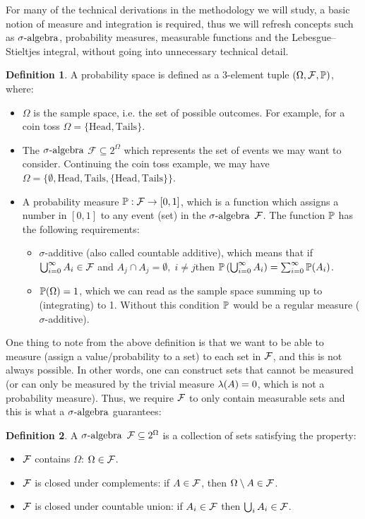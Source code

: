 \documentclass[a4paper,12pt,twoside,openright]{report}
\theoremstyle{definition}
\newtheorem{definition}{Definition}[section]
\begin{document}
For many of the technical derivations in the methodology we will study, a basic notion of measure and integration is required, thus we will refresh concepts such as $\sigalg$, probability measures,  measurable functions and the Lebesgue–Stieltjes integral, without going into unnecessary technical detail.

\begin{definition} \label{def:prob_space}
A probability space is defined as a 3-element tuple $\probspace$, where:
\begin{itemize}
    \item $\Omega$ is the sample space, i.e. the set of possible outcomes. For example, for a coin toss $\Omega=\{\text{Head}, \text{Tails}\}$. 
    \item The $\sigalg$ $\mathcal{F} \subseteq 2^{\Omega}$ which represents the set of events we may want to consider. Continuing the coin toss example, we may have $\Omega=\{\emptyset, \text{Head}, \text{Tails},\{\text{Head}, \text{Tails}\}\}$.
    \item A probability measure $\P:\calF \rightarrow [0,1]$, which is a function which assigns a number in $[0,1]$ to any event (set) in the $\sigalg$ $\calF$. The function $\P$ has the following requirements:
    \begin{itemize}
        \item $\sigma$-additive (also called countable additive), which means that if  $\bigcup_{i=0}^\infty  A_i\in \calF$ and $A_j \cap A_j = \emptyset, \; i \neq j$then $\P\left(\bigcup_{i=0}^\infty A_i\right) =\sum_{i=0}^\infty \P(A_i) $.
        \item $\P(\Omega)=1$, which we can read as the sample space summing up to (integrating) to 1.  Without this condition $\P$ would be a regular measure ($\sigma$-additive).
    \end{itemize}
\end{itemize}
\end{definition}
One thing to note from the above definition is that we want to be able to measure (assign a value/probability to a set) to each set in $\calF$, and this is not always possible. In other words, one can construct sets that cannot be measured (or can only be measured by the trivial measure $\callambda(A) = 0$, which is not a probability measure). Thus, we require $\calF$ to only contain measurable sets and this is what a $\sigalg$ guarantees:
\begin{definition}\label{def:sigma_algebra}
A $\sigalg$ $\calF \subseteq 2^{\Omega}$ is a collection of sets satisfying the property:
\begin{itemize}
    \item $\calF$ contains $\Omega$: $\Omega \in \calF$.
    \item $\calF$ is closed under complements: if $A\in\calF$, then $\Omega \setminus A \in \calF$.
    \item $\calF$ is closed under countable union:  if $A_i \in \calF$ then $\bigcup_i A_i \in \calF$.
\end{itemize}
\end{definition}
\end{document}
